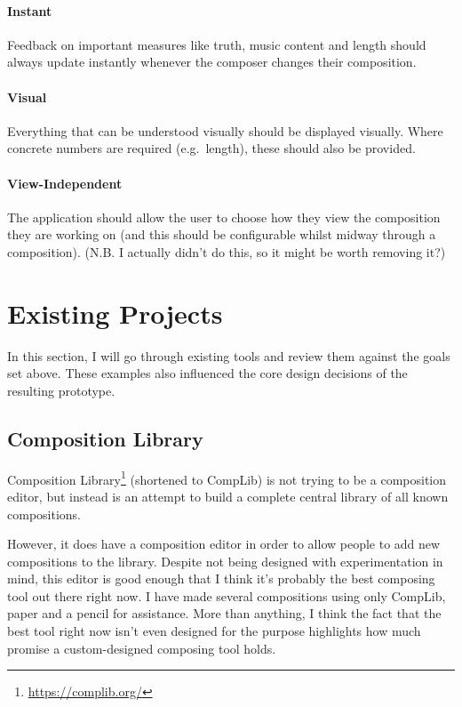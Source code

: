 \documentclass[12pt]{article}
\newcommand{\footurl}[1]{\footnote{\url{#1}}}
\begin{document}
\paragraph{Instant} Feedback on important measures like truth, music content and length should
always update instantly whenever the composer changes their composition.

\paragraph{Visual} Everything that can be understood visually should be displayed visually.  Where
concrete numbers are required (e.g.\ length), these should also be provided.

\paragraph{View-Independent} The application should allow the user to choose how they view the
composition they are working on (and this should be configurable whilst midway through a
composition).  (N.B. I actually didn't do this, so it might be worth removing it?)



\pagebreak

\section{Existing Projects}

In this section, I will go through existing tools and review them against the goals set above.
These examples also influenced the core design decisions of the resulting prototype.

\subsection{Composition Library}

Composition Library\footurl{https://complib.org/} (shortened to CompLib) is not
trying to be a composition editor, but instead is an attempt to build a complete central library of
all known compositions.

However, it does have a composition editor in order to allow people to add new compositions to the
library.  Despite not being designed with experimentation in mind, this editor is good enough that
I think it's probably the best composing tool out there right now.  I have made several
compositions using only CompLib, paper and a pencil for assistance.  More than anything, I think the
fact that the best tool right now isn't even designed for the purpose highlights how much promise a
custom-designed composing tool holds.
\end{document}
